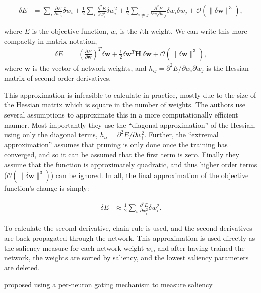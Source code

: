 \documentclass[thesis]{subfiles}
\begin{document}
    \begin{align}
       \delta E &= \sum_i \frac{\partial E}{\partial w_i} \delta w_i + \frac{1}{2} \sum_i \frac{\partial^2 E}{\partial w_i^2} \delta w_i^2 + \frac{1}{2} \sum_{i\neq j} \frac{\partial^2 E}{\partial w_i \partial w_j} \delta w_i \delta w_j +\mathcal{O}(\|\delta \mathbf{w}\|^3),
    \end{align}

    where $E$ is the objective function, $w_i$ is the $i$th weight. We can write this more compactly in matrix notation,
    \begin{align}
       \delta E &= \left( \frac{\partial E}{\partial \mathbf{w}} \right)^T \delta \mathbf{w} +\frac{1}{2}\delta \mathbf{w}^T \mathbf{H}\, \delta \mathbf{w} +\mathcal{O}(\|\delta \mathbf{w}\|^3),
    \end{align}
    where $\mathbf{w}$ is the vector of network weights, and $h_{ij}=\partial^2 E / \partial w_i \partial w_j$ is the Hessian matrix of second order derivatives. 

    This approximation is infeasible to calculate in practice, mostly due to the size of the Hessian matrix which is square in the number of weights. The authors use several assumptions to approximate this in a more computationally efficient manner. Most importantly they use the ``diagonal approximation'' of the Hessian, using only the diagonal terms, $h_{ii}=\partial^2 E / \partial w_i^2$. Further, the ``extremal approximation'' assumes that pruning is only done once the training has converged, and so it can be assumed that the first term is zero. Finally they assume that the function is approximately quadratic, and thus higher order terms (\ie $\mathcal{O}(\|\delta \mathbf{w}\|^3)$) can be ignored. In all, the final approximation of the objective function's change is simply:

    \begin{align}
       \delta E &\approx \frac{1}{2} \sum_i \frac{\partial^2 E}{\partial w_i^2} \delta w_i^2.
    \end{align}

    To calculate the second derivative, chain rule is used, and the second derivatives are back-propagated through the network. This approximation is used directly as the saliency measure for each network weight $w_i$, and after having trained the network, the weights are sorted by saliency, and the lowest saliency parameters are deleted.
    
    \citet{hanson1989comparing} proposed using a per-neuron gating mechanism to measure saliency
    
\end{document}
